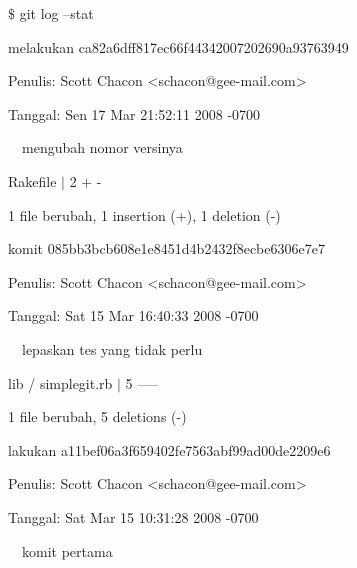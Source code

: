 \noindent 
 \hspace*{0.5in}  $  \$  $ git log --stat \par
\noindent 
 \hspace*{0.5in} melakukan ca82a6dff817ec66f44342007202690a93763949 \par
\noindent 
 \hspace*{0.5in} Penulis: Scott Chacon <schacon@gee-mail.com> \par
\noindent 
 \hspace*{0.5in} Tanggal: Sen 17 Mar 21:52:11 2008 -0700 \par
\noindent 
 \hspace*{0.5in}  $  $ $  $ $  $ $  $mengubah nomor versinya \par
\noindent 
 \hspace*{0.5in}  $  $Rakefile  $  \vert  $ 2 + - \par
\noindent 
 \hspace*{0.5in}  $  $1 file berubah, 1 insertion (+), 1 deletion (-) \par
\noindent 
 \hspace*{0.5in} komit 085bb3bcb608e1e8451d4b2432f8ecbe6306e7e7 \par
\noindent 
 \hspace*{0.5in} Penulis: Scott Chacon <schacon@gee-mail.com> \par
\noindent 
 \hspace*{0.5in} Tanggal: Sat 15 Mar 16:40:33 2008 -0700 \par
\noindent 
 \hspace*{0.5in}  $  $ $  $ $  $ $  $lepaskan tes yang tidak perlu \par
\noindent 
 \hspace*{0.5in}  $  $lib / simplegit.rb  $  \vert  $ 5 ----- \par
\noindent 
 \hspace*{0.5in}  $  $1 file berubah, 5 deletions (-) \par
\noindent 
 \hspace*{0.5in} lakukan a11bef06a3f659402fe7563abf99ad00de2209e6 \par
\noindent 
 \hspace*{0.5in} Penulis: Scott Chacon <schacon@gee-mail.com> \par
\noindent 
 \hspace*{0.5in} Tanggal: Sat Mar 15 10:31:28 2008 -0700 \par
\noindent 
 \hspace*{0.5in}  $  $ $  $ $  $ $  $komit pertama \par
